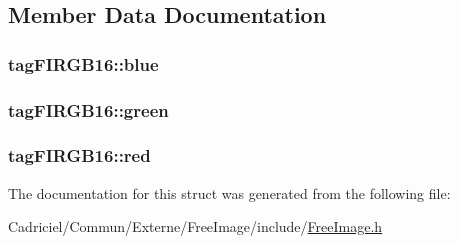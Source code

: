 \subsection{Member Data Documentation}
\hypertarget{structtag_f_i_r_g_b16_ae9de217a4d3c01c533bc8e727c0ec0eb}{
\subsubsection[{blue}]{ tag\-F\-I\-R\-G\-B16\-::blue}}\label{structtag_f_i_r_g_b16_ae9de217a4d3c01c533bc8e727c0ec0eb}
\hypertarget{structtag_f_i_r_g_b16_a00e213246943f0a47698fdd0d51f9924}{
\subsubsection[{green}]{ tag\-F\-I\-R\-G\-B16\-::green}}\label{structtag_f_i_r_g_b16_a00e213246943f0a47698fdd0d51f9924}
\hypertarget{structtag_f_i_r_g_b16_aeaa2393246d6482c02cac30d169ee022}{
\subsubsection[{red}]{ tag\-F\-I\-R\-G\-B16\-::red}}\label{structtag_f_i_r_g_b16_aeaa2393246d6482c02cac30d169ee022}


The documentation for this struct was generated from the following file\-:\begin{DoxyCompactItemize}
\item 
Cadriciel/\-Commun/\-Externe/\-Free\-Image/include/\hyperlink{_free_image_8h}{Free\-Image.\-h}\end{DoxyCompactItemize}

